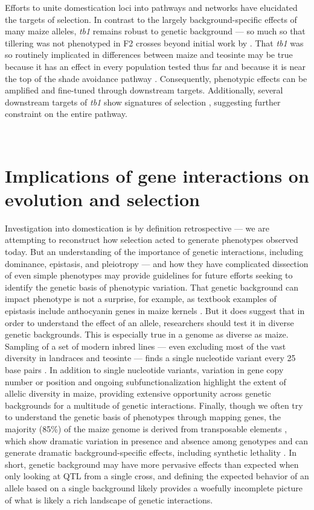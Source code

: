 \documentclass[a4paper]{article}
\newcommand{\mcs}[1]{\todo[size=\tiny, color=magenta!20]{#1}}
\begin{document}
\mcs{this next paragraph is confusing}
﻿Efforts to unite domestication loci into pathways and networks have elucidated the targets of selection.
In contrast to the largely background-specific effects of many maize alleles, \textit{tb1} remains robust to genetic background --- so much so that tillering was not phenotyped in F2 crosses beyond initial work by \citet{doebley1991}.
﻿That  \textit{tb1} was so routinely implicated in differences between maize and teosinte may be true because it has an effect in every population tested thus far and because it is near the top of the shade avoidance pathway \citep{studer2017}.
﻿Consequently, phenotypic effects can be amplified and fine-tuned through downstream targets.
Additionally, several downstream targets of \textit{tb1} show signatures of selection \citep{studer2017}, suggesting further constraint on the entire pathway.

﻿\section*{Implications of gene interactions on evolution and selection}

﻿Investigation into domestication is by definition retrospective --- we are attempting to reconstruct how selection acted to generate phenotypes observed today.
But an understanding of the importance of genetic interactions, including dominance, epistasis, and pleiotropy --- and how they have complicated dissection of even simple phenotypes may provide guidelines for future efforts seeking to identify the genetic basis of phenotypic variation.
That genetic background can impact phenotype is not a surprise, for example, as textbook examples of epistasis include anthocyanin genes in maize kernels \citep{coe1988}.
But it does suggest that in order to understand the effect of an allele, researchers should test it in diverse genetic backgrounds.
This is especially true in a genome as diverse as maize.
Sampling of a set of modern inbred lines --- even excluding most of the vast diversity in landraces and teosinte --- finds a single nucleotide variant every 25 base pairs \citep{bukowski2015}.
In addition to single nucleotide variants, variation in gene copy number \citep{swanson2010} or position \citep{liu2012} and ongoing
 subfunctionalization \citep{pophaly2015} highlight the extent of allelic diversity in maize, providing extensive opportunity across genetic backgrounds for a multitude of  genetic interactions.
Finally, though we often try to understand the genetic basis of phenotypes through mapping genes, the majority (85\%) of the maize genome is derived from transposable elements \citep{schnable2009}, which show dramatic variation in presence and absence among genotypes \citep{wang2006} and can generate  dramatic background-specific effects, including synthetic lethality \citep{gutierreznava1998}.
In short, genetic background may have more pervasive effects than expected when only looking at QTL from a single cross, and defining the expected behavior of an allele based on a single background likely provides a woefully incomplete picture of what is likely a rich landscape of genetic interactions.
\end{document}

